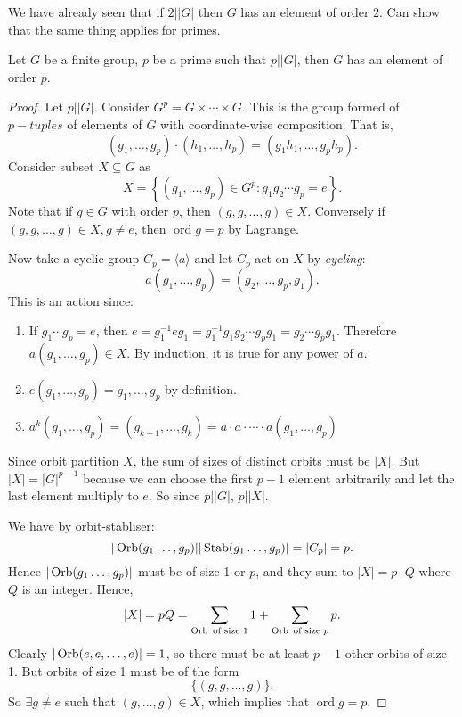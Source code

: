 \documentclass[10pt]{article}
\DeclareMathOperator{\ord}{ord}
\begin{document}
      We have already seen that if $2||G|$ then $G$ has an element of order 2. Can show that the same thing applies for primes.

      \begin{theorem}[Cauchy]\label{thm:Cauchy}
          Let $G$ be a finite group, $p$ be a prime such that $p||G|$, then $G$ has an element of order $p$. 
      \end{theorem}
      \begin{proof}
          Let $p||G|$. Consider $ G^p = G\times \cdots \times G $. This is the group formed of $p-tuples$ of elements of $G$ with coordinate-wise composition. That is,
          \[
              (g_1,\dots,g_p)\cdot (h_1,\dots,h_p)=(g_1h_1,\dots,g_ph_p)
          .\]
          Consider subset $ X \subseteq G $ as 
          \[
              X = \left\{ (g_1,\dots,g_p)\in G^p: g_1g_2\cdots g_p = e\right\}
          .\]
          Note that if $g\in G$ with order $p$, then $ (g,g,\dots,g)\in X $. Conversely if $ (g,g,\dots,g)\in X, g\neq e $, then $ \ord g=p $ by Lagrange.

          Now take a cyclic group $C_p=\langle a \rangle $ and let $C_p$ act on $X$ by \textit{cycling}:
          \[
              a(g_1,\dots,g_p)=(g_2,\dots, g_p,g_1)
          .\] 
          This is an action since:
          \begin{enumerate}[(1)]
              \item If $ g_1\cdots g_p=e $, then $ e=g_1^{-1}eg_1=g_1^{-1}g_1g_2\cdots g_p g_1=g_2\cdots g_pg_1 $. Therefore $ a(g_1,\dots,g_p) \in X$. By induction, it is true for any power of $a$.
              \item $ e(g_1,\dots,g_p)=g_1,\dots,g_p $ by definition.
              \item $ a^k(g_1,\dots,g_p)=(g_{k+1},\dots,g_k)=a\cdot a\cdot \cdots \cdot a(g_1,\dots,g_p) $
          \end{enumerate}
          Since orbit partition $X$, the sum of sizes of distinct orbits must be $|X|$. But $|X|=|G|^{p-1}$ because we can choose the first $p-1$ element arbitrarily and let the last element multiply to $e$. So since $ p||G| $, $ p||X| $.

          We have by orbit-stabliser:
          \[
              |\operatorname{Orb}(g_1\dots,g_p)||\operatorname{Stab}(g_1\dots,g_p)|=|C_p|=p
          .\]
          Hence $|\operatorname{Orb}(g_1\dots,g_p)|$ must be of size 1 or $p$, and they sum to $|X|=p\cdot Q$ where $Q$ is an integer. Hence,
          \[
              |X|=pQ=\sum_{\operatorname{Orb} \text{ of size 1}} 1 + \sum_{\operatorname{Orb}\text{ of size }p} p
          .\]
          Clearly $ |\operatorname{Orb}(e,e,\dots,e)|=1 $, so there must be at least $p-1$ other orbits of size 1. But orbits of size 1 must be of the form
          \[
              \{(g,g,\dots,g)\}
          .\]
          So $ \exists g\neq e $ such that $ (g,\dots,g) \in X$, which implies that $ \boxed{\ord g = p }$.
      \end{proof}
\end{document}
